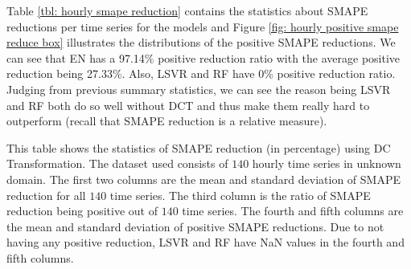 Table \ref{tbl: hourly smape reduction} contains the statistics about SMAPE reductions per time series for the models and Figure \ref{fig: hourly positive smape reduce box} illustrates the distributions of the positive SMAPE reductions. We can see that EN has a 97.14\% positive reduction ratio with the average positive reduction being 27.33\%. Also, LSVR and RF have 0\% positive reduction ratio. Judging from previous summary statistics, we can see the reason being LSVR and RF both do so well without DCT and thus make them really hard to outperform (recall that SMAPE reduction is a relative measure).
\begin{table}[H]
    \caption{Statistics of SMAPE reduction (\%) using DCT (hourly unknown domain)}
    {\raggedright \footnotesize This table shows the statistics of SMAPE reduction (in percentage) using DC Transformation. The dataset used consists of $140$ hourly time series in unknown domain. The first two columns are the mean and standard deviation of SMAPE reduction for all $140$ time series. The third column is the ratio of SMAPE reduction being positive out of $140$ time series. The fourth and fifth columns are the mean and standard deviation of positive SMAPE reductions. Due to not having any positive reduction, LSVR and RF have NaN values in the fourth and fifth columns. \par}
    \label{tbl: hourly smape reduction}
\end{table}
